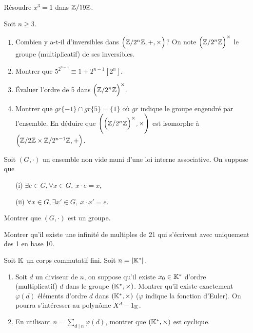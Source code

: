 \begin{exercise}
	Résoudre $x^{3}=1$ dans $\mathbb{Z}/19\mathbb{Z}$.
\end{exercise}

\begin{exercise}
	Soit $n\geqslant 3$.
	\begin{enumerate}
		\item
		Combien y a-t-il d'inversibles dans $\Bigl(\mathbb{Z}/2^{n}\mathbb{Z},+,\times\Bigr)$? On
		note $\Bigl(\mathbb{Z}/2^{n}\mathbb{Z}\Bigr)^{\times}$ le groupe (multiplicatif) de ses
		inversibles.
		\item
		Montrer que $5^{2^{n-3}}\equiv 1+2^{n-1}[2^{n}]$.
		\item
		Évaluer l'ordre de 5 dans $\Bigl(\mathbb{Z}/2^{n}\mathbb{Z}\Bigr)^{\times}$.
		\item
		Montrer que $gr\{-1\}\cap gr\{5\}=\{1\}$ où $gr$ indique le groupe
		engendré par l'ensemble. En déduire que
		$\Biggl(\Bigl(\mathbb{Z}/2^{n}\mathbb{Z}\Bigr)^{\times},\times\Biggr)$ est isomorphe à
		$\Bigl(\mathbb{Z}/2\mathbb{Z}\times\mathbb{Z}/2^{n-1}\mathbb{Z},+\Bigr)$.
	\end{enumerate}
\end{exercise}

\begin{exercise}
	Soit $(G,\cdot)$ un ensemble non vide muni d'une loi interne associative. On
	suppose que
	\begin{enumerate}
		\item
		[(i)] $\exists e\in G,\forall x\in G,~x\cdot e=x$,
		\item
		[(ii)] $\forall x\in G,\exists x'\in G,~x\cdot x'=e$.
	\end{enumerate}
	Montrer que $(G,\cdot)$ est un groupe.
\end{exercise}

\begin{exercise}
	Montrer qu'il existe une infinité de multiples de 21 qui s'écrivent avec
	uniquement des 1 en base 10.
\end{exercise}

\begin{exercise}
	Soit $\mathbb{K}$ un corps commutatif fini. Soit $n=\vert \mathbb{K}^{*}\vert$.
	\begin{enumerate}
		\item
		Soit $d$ un diviseur de $n$, on suppose qu'il existe $x_{0}\in \mathbb{K}^{*}$
		d'ordre (multiplicatif) $d$ dans le groupe $(\mathbb{K}^{*},\times)$. Montrer
		qu'il existe exactement $\varphi(d)$ éléments d'ordre $d$ dans
		$(\mathbb{K}^{*},\times)$ ($\varphi$ indique la fonction d'Euler). On pourra
		s'intéresser au polynôme $X^{d}-1_{\mathbb{K}}$.
		\item
		En utilisant $n=\sum_{d\mid n}\varphi(d)$, montrer que $(\mathbb{K}^{*},\times)$
		est cyclique.
	\end{enumerate}
\end{exercise}

